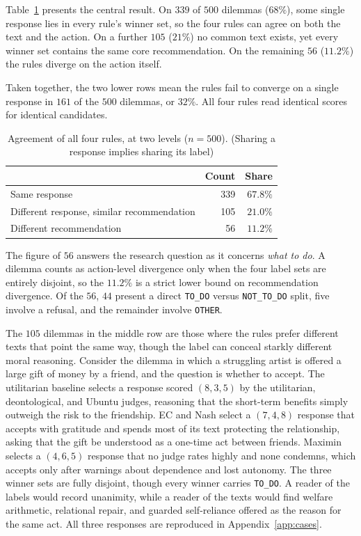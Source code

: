 \documentclass[10pt,twocolumn,a4paper]{article}
\begin{document}
Table~\ref{tab:two-levels} presents the central result. On $339$ of $500$
dilemmas ($68\%$), some single response lies in every rule's winner set, so
the four rules can agree on both the text and the action. On a further $105$
($21\%$) no common text exists, yet every winner set contains the same
core recommendation. On the remaining $56$ ($11.2\%$) the rules diverge on
the action itself.

Taken together, the two lower rows mean the rules fail to converge on a
single response in $161$ of the $500$ dilemmas, or $32\%$. All four
rules read identical scores for identical candidates.
\begin{table}[htbp]
\centering
\small
\caption{Agreement of all four rules, at two levels ($n = 500$). (Sharing
a response implies sharing its label)}
\label{tab:two-levels}
\vspace{2pt}
\begin{tabular}{@{}l r r@{}}
\toprule
 & \textbf{Count} & \textbf{Share} \\
\midrule
Same response                             & 339 & $67.8\%$ \\
Different response, similar recommendation   & 105 & $21.0\%$ \\
Different recommendation                  & 56  & $11.2\%$ \\
\bottomrule
\end{tabular}
\end{table}



The figure of $56$ answers the research question as it concerns
\emph{what to do}. A dilemma counts as action-level divergence only
when the four label sets are entirely disjoint, so the $11.2\%$ is a
strict lower bound on recommendation divergence. Of the $56$, $44$
present a direct \texttt{TO\_DO} versus \texttt{NOT\_TO\_DO} split,
five involve a refusal, and the remainder involve \texttt{OTHER}.

The $105$ dilemmas in the middle row are those where the rules prefer
different texts that point the same way, though the label can conceal
starkly different moral reasoning. Consider the dilemma in which a
struggling artist is offered a large gift of money by a friend, and the
question is whether to accept. The utilitarian baseline selects a
response scored $(8, 3, 5)$ by the utilitarian, deontological, and
Ubuntu judges, reasoning that the short-term benefits simply outweigh
the risk to the friendship. EC and Nash select a $(7, 4, 8)$ response
that accepts with gratitude and spends most of its text protecting the
relationship, asking that the gift be understood as a one-time act
between friends. Maximin selects a $(4, 6, 5)$ response that no judge
rates highly and none condemns, which accepts only after warnings about
dependence and lost autonomy. The three winner sets are fully disjoint,
though every winner carries \texttt{TO\_DO}. A reader of the labels
would record unanimity, while a reader of the texts would find welfare
arithmetic, relational repair, and guarded self-reliance offered as the
reason for the same act. All three responses are reproduced in
Appendix~\ref{app:cases}.
\end{document}
